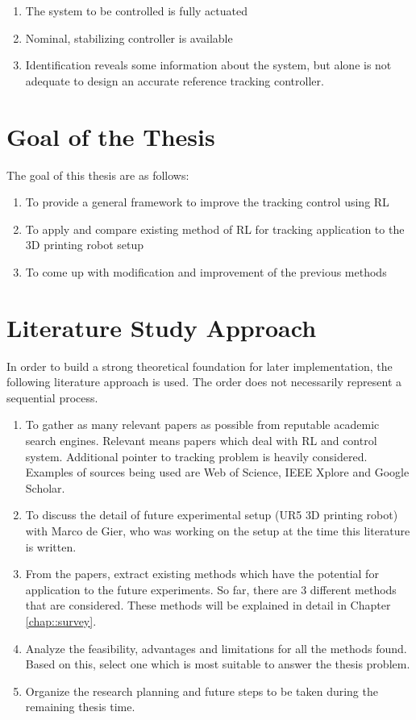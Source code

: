 \begin{enumerate}
	\item The system to be controlled is fully actuated
	\item Nominal, stabilizing controller is available	
	\item Identification reveals some information about the system, but alone is not adequate to design an accurate reference tracking controller.
\end{enumerate}

\section{Goal of the Thesis}

The goal of this thesis are as follows:
\begin{enumerate}
\item To provide a general framework to improve the tracking control using \ac{RL}
\item To apply and compare existing method of \ac{RL} for tracking application to the 3D printing robot setup
\item To come up with modification and improvement of the previous methods
\end{enumerate}

\section{Literature Study Approach}
In order to build a strong theoretical foundation for later implementation, the following literature approach is used. The order does not necessarily represent a sequential process.
\begin{enumerate}
	\item To gather as many relevant papers as possible from reputable academic search engines. Relevant means papers which deal with \ac{RL} and control system. Additional pointer to tracking problem is heavily considered. Examples of sources being used are Web of Science, IEEE Xplore and Google Scholar.
	\item To discuss the detail of future experimental setup (UR5 \ac{3D} printing robot) with Marco de Gier, who was working on the setup at the time this literature is written.
	\item From the papers, extract existing methods which have the potential for application to the future experiments. So far, there are 3 different methods that are considered. These methods will be explained in detail in Chapter \ref{chap::survey}.
	\item Analyze the feasibility, advantages and limitations for all the methods found. Based on this, select one which is most suitable to answer the thesis problem.
	\item Organize the research planning and future steps to be taken during the remaining thesis time.
	
\end{enumerate}


